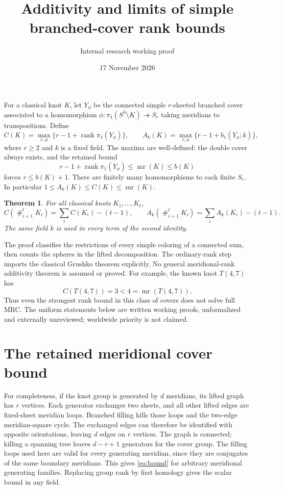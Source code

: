 \documentclass[11pt]{article}
\title{Additivity and limits of simple branched-cover rank bounds}
\author{Internal research working proof}
\date{17 November 2026}
\newtheorem{theorem}{Theorem}
\newcommand{\mr}{\operatorname{mr}}
\newcommand{\rank}{\operatorname{rank}}
\begin{document}
\maketitle

For a classical knot $K$, let $Y_\phi$ be the connected
simple $r$-sheeted branched cover associated to a homomorphism
$\phi:\pi_1(S^3\setminus K)\twoheadrightarrow S_r$ taking
meridians to transpositions. Define
\[
 C(K)=\max_{r,\phi}\{r-1+\rank\pi_1(Y_\phi)\},\qquad
 A_k(K)=\max_{r,\phi}\{r-1+b_1(Y_\phi;k)\},
\]
where $r\ge2$ and $k$ is a fixed field. The maxima are
well-defined: the double cover always exists, and the
retained bound
\begin{equation}\label{eq:bound}
                r-1+\rank\pi_1(Y_\phi)\le\mr(K)\le b(K)
\end{equation}
forces $r\le b(K)+1$. There are finitely many homomorphisms
to each finite $S_r$. In particular $1\le A_k(K)\le C(K)\le\mr(K)$.

\begin{theorem}\label{thm:add}
For all classical knots $K_1,\ldots,K_t$,
\[
 C(\mathop{\#}_{i=1}^t K_i)=\sum_i C(K_i)-(t-1),\qquad
 A_k(\mathop{\#}_{i=1}^t K_i)=\sum_i A_k(K_i)-(t-1).
\]
The same field $k$ is used in every term of the second identity.
\end{theorem}

The proof classifies the restrictions of every simple
coloring of a connected sum, then counts the spheres in
the lifted decomposition. The ordinary-rank step imports
the classical Grushko theorem explicitly. No general
meridional-rank additivity theorem is assumed or proved.
For example, the known knot $T(4,7)$ has
\[
                     C(T(4,7))=3<4=\mr(T(4,7)).
\]
Thus even the strongest rank bound in this class of covers
does not solve full MRC. The uniform statements below are
written working proofs, unformalized and externally unreviewed;
worldwide priority is not claimed.

\section{The retained meridional cover bound}

For completeness, if the knot group is generated by $d$
meridians, its lifted graph has $r$ vertices. Each generator
exchanges two sheets, and all other lifted edges are fixed-sheet
meridian loops. Branched filling kills those loops and the
two-edge meridian-square cycle. The exchanged edges can
therefore be identified with opposite orientations, leaving
$d$ edges on $r$ vertices. The graph is connected; killing
a spanning tree leaves $d-r+1$ generators for the cover group.
The filling loops used here are valid for every generating
meridian, since they are conjugates of the same boundary
meridians. This gives \eqref{eq:bound} for arbitrary
meridional generating families. Replacing group rank by
first homology gives the scalar bound in any field.
\end{document}
